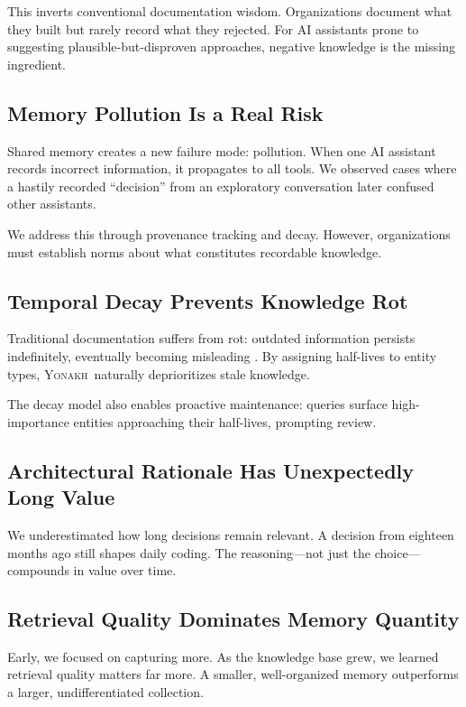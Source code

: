 \documentclass[10pt,journal,compsoc]{IEEEtran}
\newcommand{\yonakh}{\textsc{Yonakh}}
\begin{document}
This inverts conventional documentation wisdom. Organizations document what they built but rarely record what they rejected. For AI assistants prone to suggesting plausible-but-disproven approaches, negative knowledge is the missing ingredient.

\subsection{Memory Pollution Is a Real Risk}

Shared memory creates a new failure mode: pollution. When one AI assistant records incorrect information, it propagates to all tools. We observed cases where a hastily recorded ``decision'' from an exploratory conversation later confused other assistants.

We address this through provenance tracking and decay. However, organizations must establish norms about what constitutes recordable knowledge.

\subsection{Temporal Decay Prevents Knowledge Rot}

Traditional documentation suffers from rot: outdated information persists indefinitely, eventually becoming misleading \cite{parnas1994software}. By assigning half-lives to entity types, \yonakh\ naturally deprioritizes stale knowledge.

The decay model also enables proactive maintenance: queries surface high-importance entities approaching their half-lives, prompting review.

\subsection{Architectural Rationale Has Unexpectedly Long Value}

We underestimated how long decisions remain relevant. A decision from eighteen months ago still shapes daily coding. The reasoning---not just the choice---compounds in value over time.

\subsection{Retrieval Quality Dominates Memory Quantity}

Early, we focused on capturing more. As the knowledge base grew, we learned retrieval quality matters far more. A smaller, well-organized memory outperforms a larger, undifferentiated collection.
\end{document}
